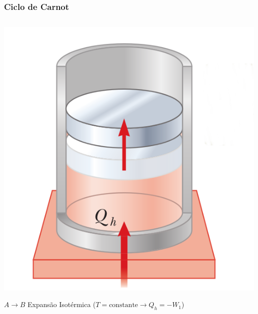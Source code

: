 \documentclass[t,%
brazilian,%
11pt,%
aspectratio=169,%
table%
]{beamer}
\begin{document}
\begin{frame}
    \frametitle{Ciclo de Carnot}

    \begin{columns}

        \begin{column}{0.45\textwidth}
            \centering
            \includegraphics[height=0.45\textheight-32pt]{images/carnot-a.png}

            \(A \rightarrow B\) Expansão Isotérmica (\(T=\text{constante} \rightarrow Q_h = -W_1\))
        \end{column}


\end{columns}
\end{frame}
\end{document}
